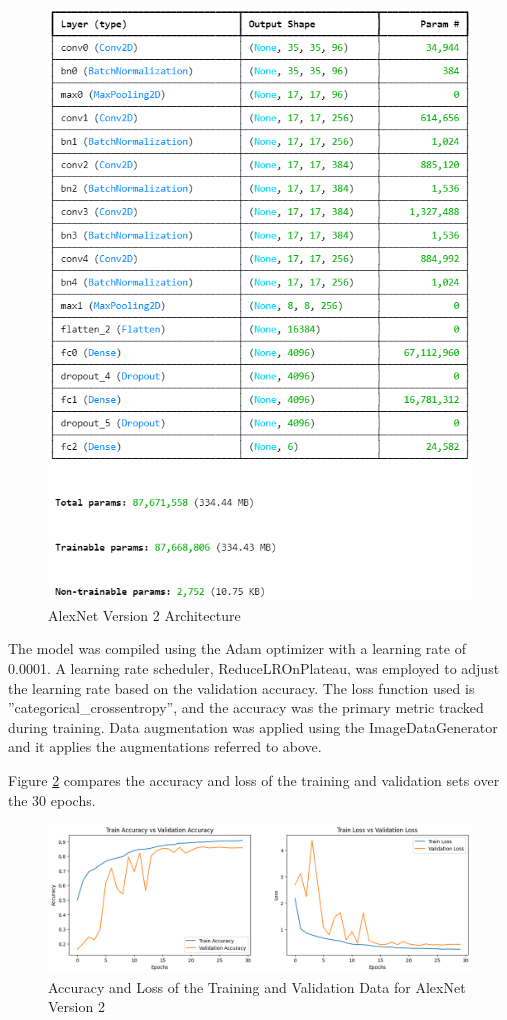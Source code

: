\documentclass[conference]{IEEEtran}
\begin{document}
\begin{figure}[H]
    \centering
    \includegraphics[width=0.9\linewidth]{images/arch2AlexNet.png}
    \caption{AlexNet Version 2 Architecture}
    \label{fig:arch2AlexNet}
\end{figure}

The model was compiled using the Adam optimizer with
a learning rate of 0.0001. A learning rate scheduler,
ReduceLROnPlateau, was employed to adjust the learning rate
based on the validation accuracy. The loss function used is
”categorical\_crossentropy”, and the accuracy was the primary
metric tracked during training.
Data augmentation was applied using the ImageDataGenerator and it applies the augmentations referred to above.

Figure \ref{fig:accuracyLossAlexNet2} compares the accuracy and loss of the training and validation sets over the 30 epochs.

\begin{figure}[H]
    \centering
    \includegraphics[width=1\linewidth]{images/acc_loss_alex_2.png}
    \caption{Accuracy and Loss of the Training and Validation Data for
    AlexNet Version 2}
    \label{fig:accuracyLossAlexNet2}
\end{figure}
\end{document}
